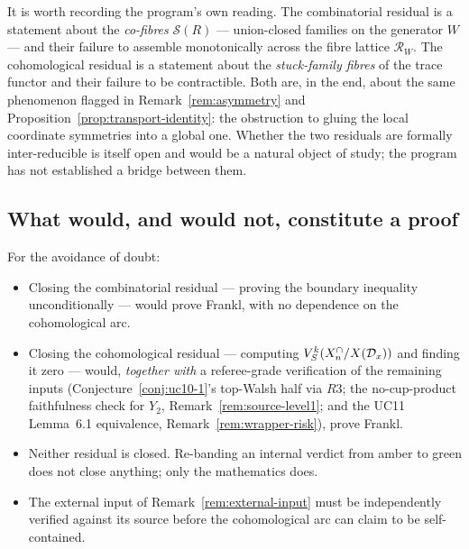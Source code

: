 \begin{description}[leftmargin=1.6em,style=nextline]
\end{description}

\begin{remark}
\label{rem:same-difficulty}
It is worth recording the program's own reading. The combinatorial
residual is a statement about the \emph{co-fibres} $\mathcal S(R)$ ---
union-closed families on the generator $W$ --- and their failure to
assemble monotonically across the fibre lattice $\mathcal R_W$. The
cohomological residual is a statement about the \emph{stuck-family
fibres} of the trace functor and their failure to be contractible. Both
are, in the end, about the same phenomenon flagged in
Remark~\ref{rem:asymmetry} and Proposition~\ref{prop:transport-identity}:
the obstruction to gluing the local coordinate symmetries into a global
one. Whether the two residuals are formally inter-reducible is itself
open and would be a natural object of study; the program has not
established a bridge between them.
\end{remark}

\subsection{What would, and would not, constitute a proof}
\label{ssec:what-closes}

For the avoidance of doubt:

\begin{itemize}[leftmargin=1.6em]
\item Closing the combinatorial residual --- proving the boundary
  inequality unconditionally --- would prove Frankl, with no
  dependence on the cohomological arc.
\item Closing the cohomological residual --- computing
  $V_{S}^{k}(X^{\cap}_n/X(\mathcal{D}_x))$ and finding it zero --- would, \emph{together
  with} a referee-grade verification of the remaining inputs
  (Conjecture~\ref{conj:uc10-1}'s top-Walsh half via $R3$; the
  no-cup-product faithfulness check for $Y_2$,
  Remark~\ref{rem:source-level1}; and the UC11 Lemma~6.1 equivalence,
  Remark~\ref{rem:wrapper-risk}), prove Frankl.
\item Neither residual is closed. Re-banding an internal verdict from
  amber to green does not close anything; only the mathematics does.
\item The external input of Remark~\ref{rem:external-input} must be
  independently verified against its source before the cohomological
  arc can claim to be self-contained.
\end{itemize}

